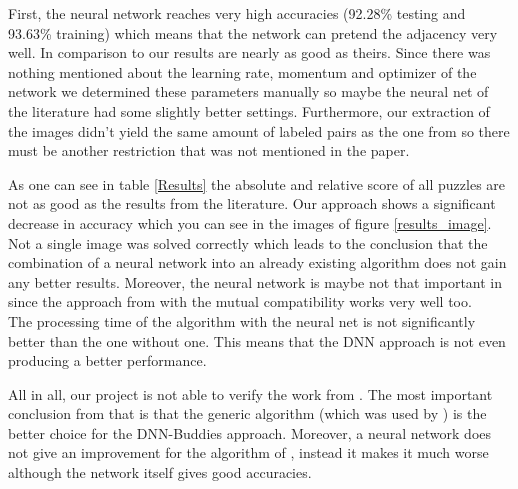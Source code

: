 \documentclass[11pt]{report}
\begin{document}
First, the neural network reaches very high accuracies (92.28\% testing and 93.63\% training) which means that the network can pretend the adjacency very well. In comparison to \cite{sholomon2016dnn} our results are nearly as good as theirs. Since there was nothing mentioned about the learning rate, momentum and optimizer of the network we determined these parameters manually so maybe the neural net of the literature had some slightly better settings. Furthermore, our extraction of the images didn't yield the same amount of labeled pairs as the one from \cite{sholomon2016dnn} so there must be another restriction that was not mentioned in the paper.

As one can see in table \ref{Results} the absolute and relative score of all puzzles are not as good as the results from the literature. Our approach shows a significant decrease in accuracy which you can see in the images of figure \ref{results_image}.
Not a single image was solved correctly which leads to the conclusion that the combination of a neural network into an already existing algorithm does not gain any better results. Moreover, the neural network is maybe not that important in \cite{sholomon2016dnn} since the approach from \cite{Paikin2015} with the mutual compatibility works very well too.\\
The processing time of the algorithm with the neural net is not significantly
better than the one without one. This means that the DNN approach is not even
producing a better performance.

All in all, our project is not able to verify the work from \cite{sholomon2016dnn}. The most important conclusion from that is that the generic algorithm (which was used by \cite{sholomon2016dnn}) is the better choice for the DNN-Buddies approach. Moreover, a neural network does not give an improvement for the algorithm of \cite{Paikin2015}, instead it makes it much worse although the network itself gives good accuracies.



\end{document}
